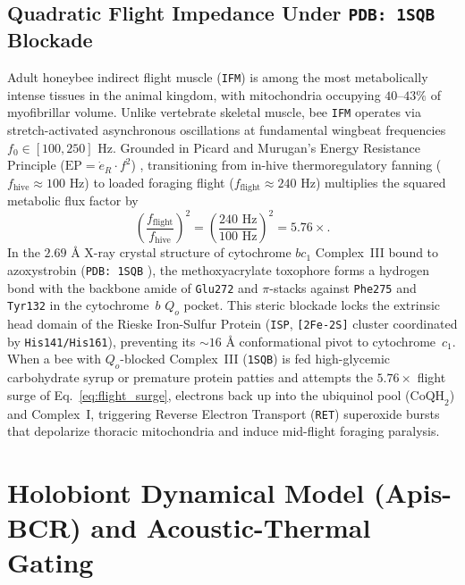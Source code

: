 \documentclass[11pt]{article}
\begin{document}
\subsection{Quadratic Flight Impedance Under \texttt{PDB: 1SQB} Blockade}
Adult honeybee indirect flight muscle (\texttt{IFM}) is among the most metabolically intense tissues in the animal kingdom, with mitochondria occupying $40\text{--}43\%$ of myofibrillar volume. Unlike vertebrate skeletal muscle, bee \texttt{IFM} operates via stretch-activated asynchronous oscillations at fundamental wingbeat frequencies $f_0 \in [100, 250]\text{ Hz}$. Grounded in Picard and Murugan's Energy Resistance Principle ($\mathrm{EP} = \dot{e}_R \cdot f^2$) \cite{picard2025energy}, transitioning from in-hive thermoregulatory fanning ($f_{\mathrm{hive}} \approx 100\text{ Hz}$) to loaded foraging flight ($f_{\mathrm{flight}} \approx 240\text{ Hz}$) multiplies the squared metabolic flux factor by
\begin{equation}
  \left(\frac{f_{\mathrm{flight}}}{f_{\mathrm{hive}}}\right)^2 = \left(\frac{240\text{ Hz}}{100\text{ Hz}}\right)^2 = 5.76\times .
  \label{eq:flight_surge}
\end{equation}
In the $2.69\text{ \AA}$ X-ray crystal structure of cytochrome $bc_1$ Complex~III bound to azoxystrobin (\texttt{PDB: 1SQB} \cite{esser2006bc1}), the methoxyacrylate toxophore forms a hydrogen bond with the backbone amide of \texttt{Glu272} and $\pi$-stacks against \texttt{Phe275} and \texttt{Tyr132} in the cytochrome~$b$ $Q_o$ pocket. This steric blockade locks the extrinsic head domain of the Rieske Iron-Sulfur Protein (\texttt{ISP}, \texttt{[2Fe-2S]} cluster coordinated by \texttt{His141/His161}), preventing its $\sim 16\text{ \AA}$ conformational pivot to cytochrome~$c_1$. When a bee with $Q_o$-blocked Complex~III (\texttt{1SQB}) is fed high-glycemic carbohydrate syrup or premature protein patties and attempts the $5.76\times$ flight surge of Eq.~\eqref{eq:flight_surge}, electrons back up into the ubiquinol pool ($\mathrm{CoQH}_2$) and Complex~I, triggering Reverse Electron Transport (\texttt{RET}) superoxide bursts that depolarize thoracic mitochondria and induce mid-flight foraging paralysis.

\section{Holobiont Dynamical Model (\textbf{Apis-BCR}) and Acoustic-Thermal Gating}
\end{document}
